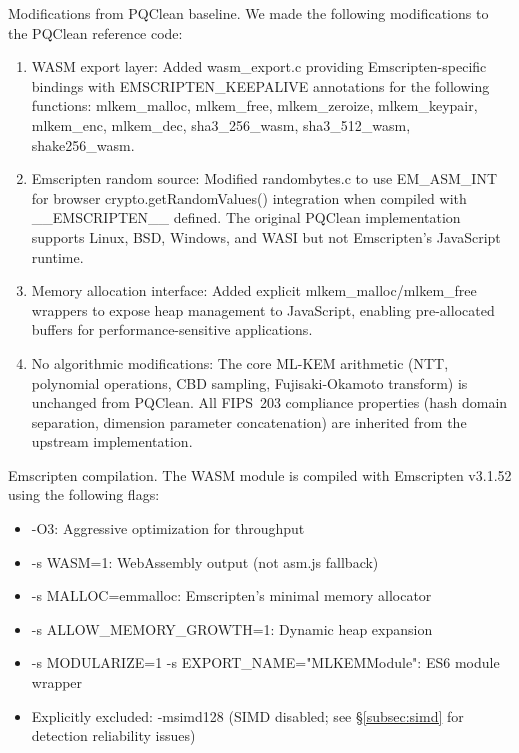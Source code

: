 \documentclass[11pt,a4paper]{article}
\def\textbf#1{#1}%
\def\texttt#1{#1}%
\begin{document}
\textbf{Modifications from PQClean baseline.} We made the following modifications to the PQClean reference code:
\begin{enumerate}
    \item \textbf{WASM export layer:} Added \texttt{wasm\_export.c} providing Emscripten-specific bindings with \texttt{EMSCRIPTEN\_KEEPALIVE} annotations for the following functions: \texttt{mlkem\_malloc}, \texttt{mlkem\_free}, \texttt{mlkem\_zeroize}, \texttt{mlkem\_keypair}, \texttt{mlkem\_enc}, \texttt{mlkem\_dec}, \texttt{sha3\_256\_wasm}, \texttt{sha3\_512\_wasm}, \texttt{shake256\_wasm}.
    \item \textbf{Emscripten random source:} Modified \texttt{randombytes.c} to use \texttt{EM\_ASM\_INT} for browser \texttt{crypto.getRandomValues()} integration when compiled with \texttt{\_\_EMSCRIPTEN\_\_} defined. The original PQClean implementation supports Linux, BSD, Windows, and WASI but not Emscripten's JavaScript runtime.
    \item \textbf{Memory allocation interface:} Added explicit \texttt{mlkem\_malloc}/\texttt{mlkem\_free} wrappers to expose heap management to JavaScript, enabling pre-allocated buffers for performance-sensitive applications.
    \item \textbf{No algorithmic modifications:} The core ML-KEM arithmetic (NTT, polynomial operations, CBD sampling, Fujisaki-Okamoto transform) is unchanged from PQClean. All FIPS~203 compliance properties (hash domain separation, dimension parameter concatenation) are inherited from the upstream implementation.
\end{enumerate}

\textbf{Emscripten compilation.} The WASM module is compiled with Emscripten v3.1.52 using the following flags:
\begin{itemize}
    \item \texttt{-O3}: Aggressive optimization for throughput
    \item \texttt{-s WASM=1}: WebAssembly output (not asm.js fallback)
    \item \texttt{-s MALLOC=emmalloc}: Emscripten's minimal memory allocator
    \item \texttt{-s ALLOW\_MEMORY\_GROWTH=1}: Dynamic heap expansion
    \item \texttt{-s MODULARIZE=1 -s EXPORT\_NAME="MLKEMModule"}: ES6 module wrapper
    \item \textbf{Explicitly excluded:} \texttt{-msimd128} (SIMD disabled; see \S\ref{subsec:simd} for detection reliability issues)
\end{itemize}
\end{document}
